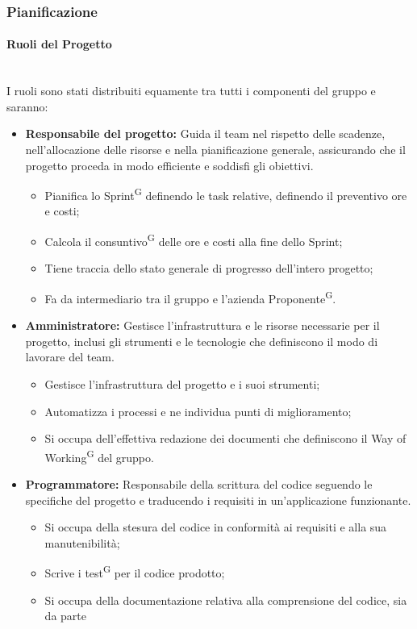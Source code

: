 \documentclass[8pt]{article}
\newcommand{\glossterm}[1]{#1\textsuperscript{G}} %
\newcommand{\subsubsubsection}[1]{\paragraph{#1}\mbox{}\\}
\begin{document}
\subsubsection{Pianificazione} \label{sec:pianificazione}

\subsubsubsection{Ruoli del Progetto}
I ruoli sono stati distribuiti equamente tra tutti i componenti del gruppo e saranno:
\begin{itemize}
	\item \textbf{Responsabile del progetto:} Guida il team nel rispetto delle scadenze, nell'allocazione delle risorse e nella pianificazione generale, assicurando che il progetto proceda in modo efficiente e soddisfi gli obiettivi.
	\begin{itemize}
    \item Pianifica lo \glossterm{Sprint} definendo le task relative, definendo il preventivo ore e costi;
    \item Calcola il \glossterm{consuntivo} delle ore e costi alla fine dello Sprint;
    \item Tiene traccia dello stato generale di progresso dell'intero progetto;
    \item Fa da intermediario tra il gruppo e l'azienda \glossterm{Proponente}.
  \end{itemize}
	\item \textbf{Amministratore:} Gestisce l'infrastruttura e le risorse necessarie per il progetto, inclusi gli strumenti e le tecnologie che definiscono il modo di lavorare del team.
	\begin{itemize}
    \item Gestisce l'infrastruttura del progetto e i suoi strumenti;
    \item Automatizza i processi e ne individua punti di miglioramento;
    \item Si occupa dell'effettiva redazione dei documenti che definiscono il \glossterm{Way of
        Working} del gruppo.
	\end{itemize}
  \item \textbf{Programmatore:} Responsabile della scrittura del codice seguendo le specifiche del progetto e traducendo i requisiti in un'applicazione funzionante.
	\begin{itemize}
    \item Si occupa della stesura del codice in conformità ai requisiti e alla sua manutenibilità;
    \item Scrive i \glossterm{test} per il codice prodotto;
    \item Si occupa della documentazione relativa alla comprensione del codice, sia da parte

\end{itemize}
\end{itemize}
\end{document}
